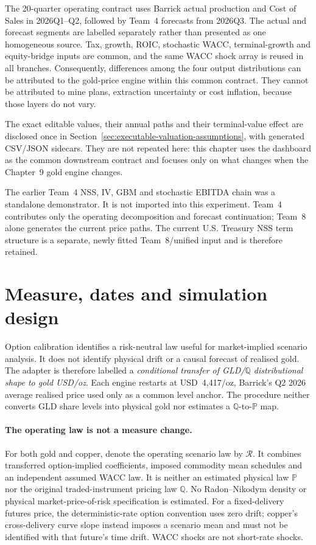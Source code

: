 The 20-quarter operating contract uses Barrick actual production and Cost of
Sales in 2026Q1--Q2, followed by Team~4 forecasts from 2026Q3. The actual and
forecast segments are labelled separately rather than presented as one
homogeneous source. Tax, growth, ROIC, stochastic WACC, terminal-growth and
equity-bridge inputs are common, and the same WACC shock array is reused in all
branches. Consequently, differences among the four output distributions can
be attributed to the gold-price engine within this common contract. They
cannot be attributed to mine plans, extraction uncertainty or cost inflation,
because those layers do not vary.

The exact editable values, their annual paths and their terminal-value effect
are disclosed once in Section~\ref{sec:executable-valuation-assumptions}, with
generated CSV/JSON sidecars. They are not repeated here: this chapter uses the
dashboard as the common downstream contract and focuses only on what changes
when the Chapter~9 gold engine changes.

The earlier Team~4 NSS, IV, GBM and stochastic EBITDA chain was a standalone
demonstrator. It is not imported into this experiment. Team~4 contributes only
the operating decomposition and forecast continuation; Team~8 alone generates
the current price paths. The current U.S. Treasury NSS term structure is a separate,
newly fitted Team~8/unified input and is therefore retained.

\section{Measure, dates and simulation design}

Option calibration identifies a risk-neutral law useful for market-implied
scenario analysis. It does not identify physical drift or a causal forecast of
realised gold. The adapter is therefore labelled a \emph{conditional transfer
of GLD/\(\mathbb Q\) distributional shape to gold USD/oz}. Each engine
restarts at USD~4,417/oz, Barrick's Q2 2026 average realised price used only
as a common level anchor. The procedure neither
converts GLD share levels into physical gold nor estimates a
\(\mathbb Q\)-to-\(\mathbb P\) map.

\paragraph{The operating law is not a measure change.}
For both gold and copper, denote the operating scenario law by $\mathcal R$.
It combines transferred option-implied coefficients, imposed commodity mean
schedules and an independent assumed WACC law. It is neither an estimated
physical law $\mathbb P$ nor the original traded-instrument pricing law
$\mathbb Q$. No Radon--Nikodym density or physical market-price-of-risk
specification is estimated. For a fixed-delivery futures price, the
deterministic-rate option convention uses zero drift; copper's
cross-delivery curve slope instead imposes a scenario mean and must not be
identified with that future's time drift. WACC shocks are not short-rate shocks.

